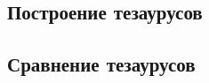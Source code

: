 \documentclass[coursework]{SCWorks}
\begin{document}
\subsection{Построение тезаурусов}
\subsection{Сравнение тезаурусов}

\conclusion


% 
% 

\appendix
\end{document}

